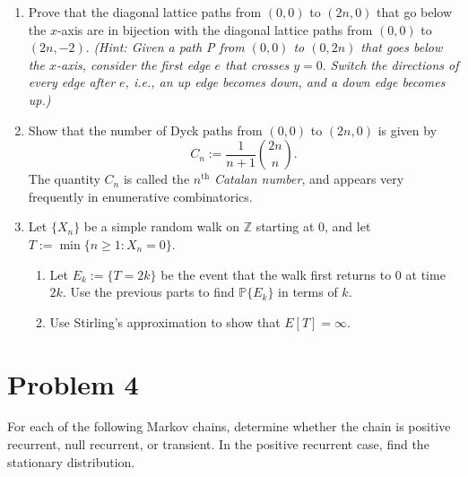 \documentclass[11pt]{article}
\begin{document}
\begin{enumerate}[label=(\alph*)]
    \item Prove that the diagonal lattice paths from \((0,0)\) to \((2n,0)\) that go below the \(x\)-axis are in bijection with the diagonal lattice paths from \((0,0)\) to \((2n,-2)\). \textit{(Hint: Given a path P from \((0,0)\) to \((0,2n)\) that goes below the \(x\)-axis, consider the first edge \(e\) that crosses \(y=0.\) Switch the directions of every edge after \(e\), i.e., an up edge becomes down, and a down edge becomes up.)}
    
    \item Show that the number of Dyck paths from \((0,0)\) to \((2n,0)\) is given by
    \[
    C_{n}:=\frac{1}{n+1}\binom{2n}{n}.
    \]
    The quantity \(C_{n}\) is called the \(n^{\text{th}}\) \textit{Catalan number}, and appears very frequently in enumerative combinatorics.
    
    \item Let \(\{X_{n}\}\) be a simple random walk on \(\mathbb{Z}\) starting at \(0\), and let \(T:=\min\{n\geq 1:X_{n}=0\}\).
    \begin{enumerate}[label=(\roman*)]
        \item Let \(E_{k}:=\{T=2k\}\) be the event that the walk first returns to \(0\) at time \(2k\). Use the previous parts to find \(\mathbb{P}\{E_{k}\}\) in terms of \(k\).
        \item Use Stirling's approximation to show that \(E[T]=\infty\).
    \end{enumerate}
\end{enumerate}

\newpage
\section*{Problem 4}
For each of the following Markov chains, determine whether the chain is positive recurrent, null recurrent, or transient. In the positive recurrent case, find the stationary distribution.
\end{document}
